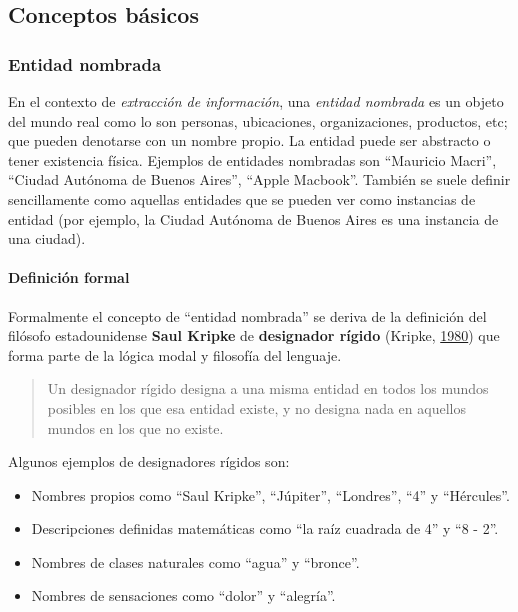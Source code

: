 \documentclass[12pt,a4paper,]{scrartcl}
\providecommand{\tightlist}{%
  \setlength{\itemsep}{0pt}\setlength{\parskip}{0pt}}
\let\oldparagraph\paragraph
\renewcommand{\paragraph}[1]{\oldparagraph{#1}\mbox{}}
\begin{document}
\hypertarget{conceptos-buxe1sicos}{%
\subsection{Conceptos básicos}\label{conceptos-buxe1sicos}}

\hypertarget{entidad-nombrada}{%
\subsubsection{Entidad nombrada}\label{entidad-nombrada}}

En el contexto de \emph{extracción de información}, una \emph{entidad nombrada} es un objeto del mundo real como lo son personas, ubicaciones, organizaciones, productos, etc; que pueden denotarse con un nombre propio. La entidad puede ser abstracto o tener existencia física. Ejemplos de entidades nombradas son \enquote{Mauricio Macri}, \enquote{Ciudad Autónoma de Buenos Aires}, \enquote{Apple Macbook}.
También se suele definir sencillamente como aquellas entidades que se pueden ver como instancias de entidad (por ejemplo, la Ciudad Autónoma de Buenos Aires es una instancia de una ciudad).

\hypertarget{ner-formal}{%
\paragraph{Definición formal}\label{ner-formal}}

Formalmente el concepto de \enquote{entidad nombrada} se deriva de la definición del filósofo estadounidense \textbf{Saul Kripke} de \textbf{designador rígido} (Kripke, \protect\hyperlink{ref-kripke1980naming}{1980}) que forma parte de la lógica modal y filosofía del lenguaje.

\begin{quote}
Un designador rígido designa a una misma entidad en todos los mundos posibles en los que esa entidad existe, y no designa nada en aquellos mundos en los que no existe.
\end{quote}

Algunos ejemplos de designadores rígidos son:

\begin{itemize}
\tightlist
\item
  Nombres propios como \enquote{Saul Kripke}, \enquote{Júpiter}, \enquote{Londres}, \enquote{4} y \enquote{Hércules}.
\item
  Descripciones definidas matemáticas como \enquote{la raíz cuadrada de 4} y \enquote{8 - 2}.
\item
  Nombres de clases naturales como \enquote{agua} y \enquote{bronce}.
\item
  Nombres de sensaciones como \enquote{dolor} y \enquote{alegría}.
\end{itemize}
\end{document}
